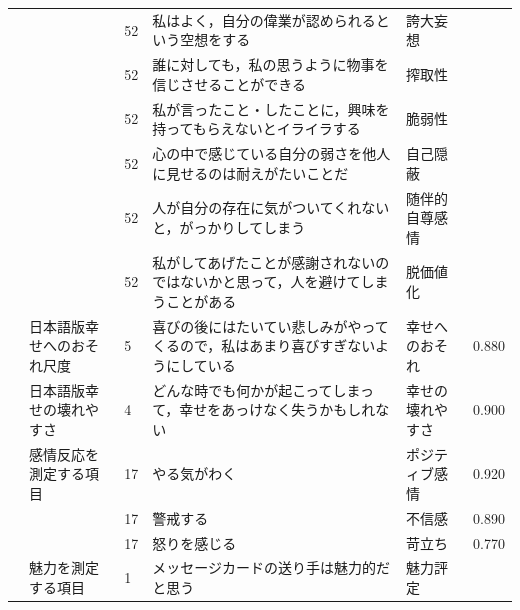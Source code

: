 \begin{landscape}
\begin{longtable}{p{2cm}p{2cm}p{2cm}p{6cm}p{2cm}p{2cm}}
		                         &                                  & 52  & 私はよく，自分の偉業が認められるという空想をする                            & 誇大妄想                 &            \\
		                         &                                  & 52  & 誰に対しても，私の思うように物事を信じさせることができる                        & 搾取性                  &            \\
		                         &                                  & 52  & 私が言ったこと・したことに，興味を持ってもらえないとイライラする                    & 脆弱性                  &            \\
		                         &                                  & 52  & 心の中で感じている自分の弱さを他人に見せるのは耐えがたいことだ                     & 自己隠蔽                 &            \\
		                         &                                  & 52  & 人が自分の存在に気がついてくれないと，がっかりしてしまう                        & 随伴的自尊感情              &            \\
		                         &                                  & 52  & 私がしてあげたことが感謝されないのではないかと思って，人を避けてしまうことがある            & 脱価値化                 &            \\
		\textcite{Namatame202192}   & 日本語版幸せへのおそれ尺度                    & 5   & 喜びの後にはたいてい悲しみがやってくるので，私はあまり喜びすぎないようにしている            & 幸せへのおそれ              & 0.880      \\
		                         & 日本語版幸せの壊れやすさ                     & 4   & どんな時でも何かが起こってしまって，幸せをあっけなく失うかもしれない                  & 幸せの壊れやすさ             & 0.900      \\
		\textcite{Ono202192}        & 感情反応を測定する項目                      & 17  & やる気がわく                                              & ポジティブ感情              & 0.920      \\
		                         &                                  & 17  & 警戒する                                                & 不信感                  & 0.890      \\
		                         &                                  & 17  & 怒りを感じる                                              & 苛立ち                  & 0.770      \\
		                         & 魅力を測定する項目                        & 1   & メッセージカードの送り手は魅力的だと思う                                & 魅力評定                 &            \\

\end{longtable}
\end{landscape}
